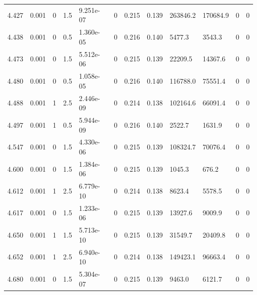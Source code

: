 \documentclass[preview]{standalone}
\begin{document}
{{{{{{{\begin{tabular}{L{1.2cm}C{1.2cm} C{0.3cm}C{0.5cm} C{1.4cm}C{1.4cm} C{1.4cm}C{1.4cm} C{1.6cm}C{1.6cm} C{1.6cm}C{1.6cm}}
  4.427  &  0.001  & 0     & 1.5 &  9.251e-07  & 0  &  0.215&   0.139& 263846.2 & 170684.9   &  0 & 0  \\ 
  4.438  &  0.001  & 0     & 0.5 &  1.360e-05  & 0  &  0.216&   0.140& 5477.3 & 3543.3   &  0 & 0  \\ 
  4.473  &  0.001  & 0     & 1.5 &  5.512e-06  & 0  &  0.215&   0.139& 22209.5 & 14367.6   &  0 & 0  \\ 
  4.480  &  0.001  & 0     & 0.5 &  1.058e-05  & 0  &  0.216&   0.140& 116788.0 & 75551.4   &  0 & 0  \\ 
  4.488  &  0.001  & 1     & 2.5 &  2.446e-09  & 0  &  0.214&   0.138& 102164.6 & 66091.4   &  0 & 0  \\ 
  4.497  &  0.001  & 1     & 0.5 &  5.944e-09  & 0  &  0.216&   0.140& 2522.7 & 1631.9   &  0 & 0  \\ 
  4.547  &  0.001  & 0     & 1.5 &  4.330e-06  & 0  &  0.215&   0.139& 108324.7 & 70076.4   &  0 & 0  \\ 
  4.600  &  0.001  & 0     & 1.5 &  1.384e-06  & 0  &  0.215&   0.139& 1045.3 & 676.2   &  0 & 0  \\ 
  4.612  &  0.001  & 1     & 2.5 &  6.779e-10  & 0  &  0.214&   0.138& 8623.4 & 5578.5   &  0 & 0  \\ 
  4.617  &  0.001  & 0     & 1.5 &  1.233e-06  & 0  &  0.215&   0.139& 13927.6 & 9009.9   &  0 & 0  \\ 
  4.650  &  0.001  & 1     & 1.5 &  5.713e-10  & 0  &  0.215&   0.139& 31549.7 & 20409.8   &  0 & 0  \\ 
  4.652  &  0.001  & 1     & 2.5 &  6.940e-10  & 0  &  0.214&   0.138& 149423.1 & 96663.4   &  0 & 0  \\ 
  4.680  &  0.001  & 0     & 1.5 &  5.304e-07  & 0  &  0.215&   0.139& 9463.0 & 6121.7   &  0 & 0  \\ 
\hline 
\end{tabular} 

}}}}}}}
\end{document}
